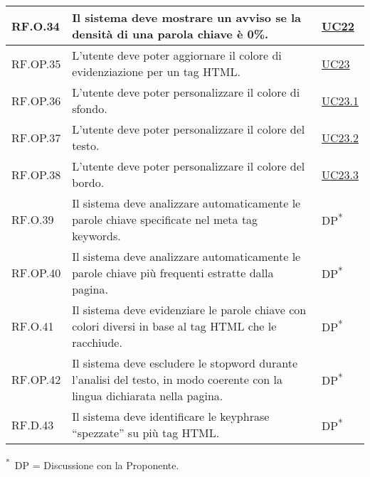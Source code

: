\begin{tabularx}{\textwidth}{l >{\raggedright\arraybackslash}X l}
\hline
RF.O.34 & Il sistema deve mostrare un avviso se la densità di una parola chiave è 0\%. & \hyperref[UC22]{UC22} \\
\hline
RF.OP.35 & L'utente deve poter aggiornare il colore di evidenziazione per un tag HTML. & \hyperref[UC23]{UC23} \\
\hline
RF.OP.36 & L'utente deve poter personalizzare il colore di sfondo. & \hyperref[UC23point1]{UC23.1} \\
\hline
RF.OP.37 & L'utente deve poter personalizzare il colore del testo. & \hyperref[UC23point2]{UC23.2} \\
\hline
RF.OP.38 & L'utente deve poter personalizzare il colore del bordo. & \hyperref[UC23point3]{UC23.3} \\
\hline
RF.O.39 & Il sistema deve analizzare automaticamente le parole chiave specificate nel meta tag keywords. & DP\textsuperscript{*} \\
\hline
RF.OP.40 & Il sistema deve analizzare automaticamente le parole chiave più frequenti estratte dalla pagina. & DP\textsuperscript{*} \\
\hline
RF.O.41 & Il sistema deve evidenziare le parole chiave con colori diversi in base al tag HTML che le racchiude. & DP\textsuperscript{*} \\
\hline
RF.OP.42 & Il sistema deve escludere le \gls{stopword} durante l'analisi del testo, in modo coerente con la lingua dichiarata nella pagina. & DP\textsuperscript{*} \\
\hline
RF.D.43 & Il sistema deve identificare le keyphrase “spezzate” su più tag HTML. & DP\textsuperscript{*} \\
\end{tabularx}

\vspace{3pt}
\noindent\textsuperscript{*}~DP = Discussione con la Proponente.

